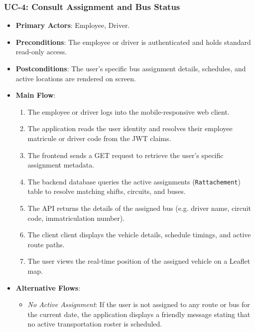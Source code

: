 \subsubsection{UC-4: Consult Assignment and Bus Status}
\begin{itemize}
  \item \textbf{Primary Actors}: Employee, Driver.
  \item \textbf{Preconditions}: The employee or driver is authenticated and holds standard read-only access.
  \item \textbf{Postconditions}: The user's specific bus assignment details, schedules, and active locations are rendered on screen.
  \item \textbf{Main Flow}:
  \begin{enumerate}
    \item The employee or driver logs into the mobile-responsive web client.
    \item The application reads the user identity and resolves their employee matricule or driver code from the JWT claims.
    \item The frontend sends a GET request to retrieve the user's specific assignment metadata.
    \item The backend database queries the active assignments (\texttt{Rattachement}) table to resolve matching shifts, circuits, and buses.
    \item The API returns the details of the assigned bus (e.g. driver name, circuit code, immatriculation number).
    \item The client client displays the vehicle details, schedule timings, and active route paths.
    \item The user views the real-time position of the assigned vehicle on a Leaflet map.
  \end{enumerate}
  \item \textbf{Alternative Flows}:
  \begin{itemize}
    \item \emph{No Active Assignment}: If the user is not assigned to any route or bus for the current date, the application displays a friendly message stating that no active transportation roster is scheduled.
  \end{itemize}
\end{itemize}

